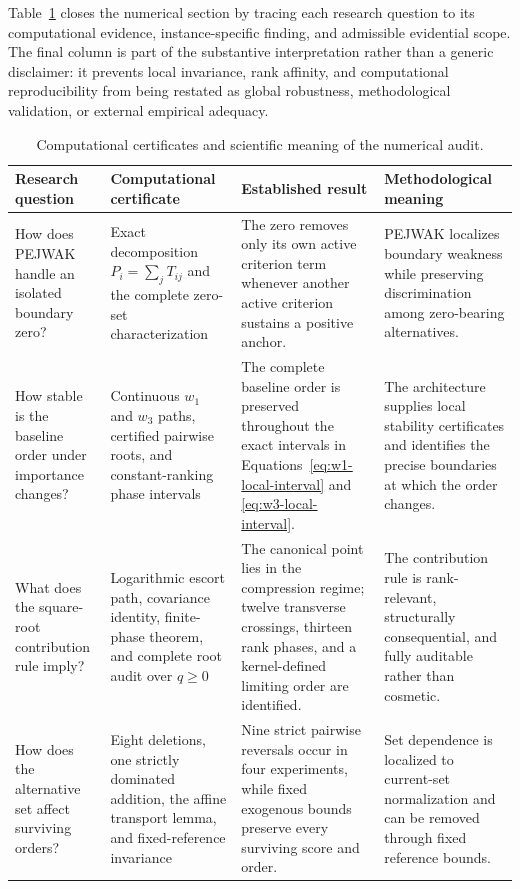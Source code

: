 \documentclass[reqno,11pt]{amsart}
\theoremstyle{definition}
\theoremstyle{plain}
\theoremstyle{remark}
\begin{document}
Table~\ref{tab:evidence-ledger} closes the numerical section by tracing
each research question to its computational evidence, instance-specific
finding, and admissible evidential scope. The final column is part of the
substantive interpretation rather than a generic disclaimer: it prevents
local invariance, rank affinity, and computational reproducibility from
being restated as global robustness, methodological validation, or
external empirical adequacy.

\begin{table}[htbp]
\centering
\scriptsize
\renewcommand{\arraystretch}{1.16}
\setlength{\tabcolsep}{4pt}
\caption{Computational certificates and scientific meaning of the
numerical audit.}
\label{tab:evidence-ledger}

\begin{tabularx}{\textwidth}{p{}XXX}
\toprule
Research question
&
Computational certificate
&
Established result
&
Methodological meaning
\\
\midrule

How does PEJWAK handle an isolated boundary zero?
&
Exact decomposition \(P_i=\sum_jT_{ij}\) and the complete zero-set
characterization
&
The zero removes only its own active criterion term whenever another
active criterion sustains a positive anchor.
&
PEJWAK localizes boundary weakness while preserving discrimination among
zero-bearing alternatives.
\\

\addlinespace[2pt]
How stable is the baseline order under importance changes?
&
Continuous \(w_1\) and \(w_3\) paths, certified pairwise roots, and
constant-ranking phase intervals
&
The complete baseline order is preserved throughout the exact intervals
in Equations~\eqref{eq:w1-local-interval} and
\eqref{eq:w3-local-interval}.
&
The architecture supplies local stability certificates and identifies
the precise boundaries at which the order changes.
\\

\addlinespace[2pt]
What does the square-root contribution rule imply?
&
Logarithmic escort path, covariance identity, finite-phase theorem, and
complete root audit over \(q\geq0\)
&
The canonical point lies in the compression regime; twelve transverse
crossings, thirteen rank phases, and a kernel-defined limiting order are
identified.
&
The contribution rule is rank-relevant, structurally consequential, and
fully auditable rather than cosmetic.
\\

\addlinespace[2pt]
How does the alternative set affect surviving orders?
&
Eight deletions, one strictly dominated addition, the affine transport
lemma, and fixed-reference invariance
&
Nine strict pairwise reversals occur in four experiments, while fixed
exogenous bounds preserve every surviving score and order.
&
Set dependence is localized to current-set normalization and can be
removed through fixed reference bounds.
\\


\end{tabularx}
\end{table}
\end{document}
